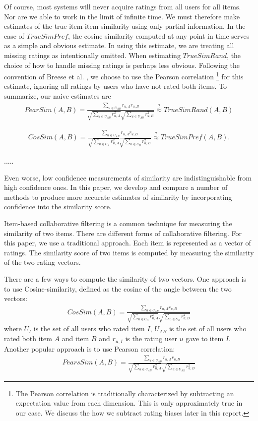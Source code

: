 \documentclass[11pt]{article}
\begin{document}
Of course, most systems will never acquire ratings from all users for all items.
Nor are we able to work in the limit of infinite time. We must therefore make
estimates of the true item-item similarity using only partial information. In
the case of $TrueSimPref$, the cosine similarity computed at any point in time
serves as a simple and obvious estimate. In using this estimate, we are treating
all missing ratings as intentionally omitted. When estimating $TrueSimRand$, the
choice of how to handle missing ratings is perhaps less obvious. Following the
convention of Breese et al. \cite{Breese1998}, we choose to use the Pearson
correlation \footnote{The Pearson correlation is traditionally characterized by
subtracting an expectation value from each dimension. This is only approximately
true in our case. We discuss the how we subtract rating biases later in this
report.} for this estimate, ignoring all ratings by users who have not rated
both items. To summarize, our naive estimates are
\begin{align}
PearSim(A, B) = \frac{\sum\limits_{u\in U_{AB}}
r_{u,A}r_{u,B}}{\sqrt{\sum\limits_{u\in U_{AB}} r_{u,A}^2}
\sqrt{\sum\limits_{u\in U_{AB}} r_{u,B}^2}}
\stackrel{?}{\approx} TrueSimRand(A, B)
\end{align}

\begin{align}
CosSim(A, B) = \frac{\sum\limits_{u\in U_{AB}}
r_{u,A}r_{u,B}}{\sqrt{\sum\limits_{u\in U_A} r_{u,A}^2}
\sqrt{\sum\limits_{u\in U_B} r_{u,B}^2}}
\stackrel{?}{\approx} TrueSimPref(A, B).
\end{align}


.....

Even worse, low confidence measurements of similarity are indistinguishable from
high confidence ones. In this paper, we develop and compare a number of methods
to produce more accurate estimates of similarity by incorporating confidence
into the similarity score.
 
Item-based collaborative filtering is a common technique for measuring the
similarity of two items. There are different forms of collaborative filtering.
For this paper, we use a traditional approach. Each item is represented as a
vector of ratings. The similarity score of two items is computed by measuring
the similarity of the two rating vectors.

There are a few ways to compute the similarity of two vectors. One approach is
to use Cosine-similarity, defined as the cosine of the angle between the two
vectors:
\begin{align}
CosSim(A, B) = \frac{\sum\limits_{u\in U_{AB}}
r_{u,A}r_{u,B}}{\sqrt{\sum\limits_{u\in U_{A}} r_{u,A}^2}
\sqrt{\sum\limits_{u\in U_{B}} r_{u,B}^2}}
\end{align}
where $U_{I}$ is the set of all users who rated item $I$, $U_{AB}$ is the set of
all users who rated both item $A$ and item $B$ and $r_{u,I}$ is the rating user
$u$ gave to item $I$. Another popular approach is to use Pearson correlation:
\begin{align}
PearsSim(A, B) = \frac{\sum\limits_{u\in U_{AB}}
r_{u,A}r_{u,B}}{\sqrt{\sum\limits_{u\in U_{AB}} r_{u,A}^2}
\sqrt{\sum\limits_{u\in U_{AB}} r_{u,B}^2}}
\end{align}
\end{document}
